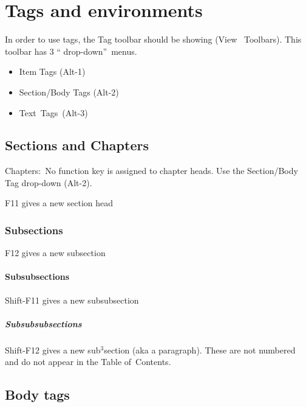                       


\chapter{Tags and environments\label{chap:tags}}

In order to use tags, the Tag toolbar should be showing (View \TEXTsymbol{>}%
\TEXTsymbol{>}\ Toolbars). This toolbar has 3 \textquotedblleft
drop-down\textquotedblright\ menus.

\begin{itemize}
\item Item Tags (Alt-1)

\item Section/Body Tags (Alt-2)

\item Text\ Tags\ (Alt-3)
\end{itemize}

\section{Sections and Chapters\label{sec:sections}}

Chapters:\ No function key is assigned to chapter heads. Use the
Section/Body Tag drop-down (Alt-2).

F11 gives a new section head

\subsection{Subsections}

F12 gives a new subsection

\subsubsection{Subsubsections}

Shift-F11 gives a new subsubsection

\paragraph{Subsubsubsections}

Shift-F12 gives a new sub$^{3}$section (aka a paragraph). These are not
numbered and do not appear in the Table of\ Contents.

\section{Body tags}

